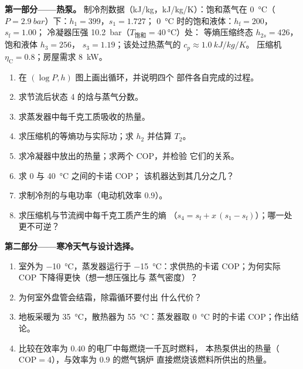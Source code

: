 \begin{problem}\label{pb:b2:open-systems:1}
\textbf{第一部分——热泵。}
制冷剂数据（\unit{kJ/kg}，\unit{kJ/kg/K}）：饱和蒸气在
\qty{0}{\celsius}（$P = \qty{2.9}{bar}$）下：$h_1 = 399$，$s_1 = 1.727$；
\qty{0}{\celsius} 时的饱和液体：$h_{\text{f}} = 200$，$s_{\text{f}} = 1.00$；
冷凝器压强 \qty{10.2}{bar}（$T_{\text{饱和}} = \qty{40}{\celsius}$）处：
等熵压缩终态 $h_{2s} = 426$，饱和液体 $h_3 = 256$，
$s_3 = 1.19$；该处过热蒸气的 $c_p \approx \qty{1.0}{kJ/kg/K}$。
压缩机 $\eta_{\text{C}} = 0.8$；房屋需求 \qty{8}{kW}。
\begin{enumerate}
  \item 在 $(\log P, h)$ 图上画出循环，并说明四个
        部件各自完成的过程。
  \item 求节流后状态 4 的焓与蒸气分数。
  \item 求蒸发器中每千克工质吸收的热量。
  \item 求压缩机的等熵功与实际功；求 $h_2$ 并估算
        $T_2$。
  \item 求冷凝器中放出的热量；求两个 COP，并检验
        它们的关系。
  \item 求 \qty{0}{} 与 \qty{40}{\celsius} 之间的卡诺 COP；
        该机器达到其几分之几？
  \item 求制冷剂的与电功率（电动机效率
        $0.9$）。
  \item 求压缩机与节流阀中每千克工质产生的熵
        （$s_4 = s_{\text{f}} + x\,(s_1 - s_{\text{f}})$）；哪一处
        更不可逆？
\end{enumerate}

\textbf{第二部分——寒冷天气与设计选择。}
\begin{enumerate}[resume]
  \item 室外为 \qty{-10}{\celsius}，蒸发器运行于
        \qty{-15}{\celsius}：求供热的卡诺 COP；为何实际
        COP 下降得更快（想一想压强比与
        蒸气密度）？
  \item 为何室外盘管会结霜，除霜循环要付出
        什么代价？
  \item 地板采暖为 \qty{35}{\celsius}，散热器为
        \qty{55}{\celsius}：蒸发器取
        \qty{0}{\celsius} 时的卡诺 COP；作出结论。
  \item 比较在效率为 $0.40$ 的电厂中每燃烧一千瓦时燃料，
        本热泵供出的热量（$\mathrm{COP}
        = 4$），与效率为 $0.9$ 的燃气锅炉
        直接燃烧该燃料所供出的热量。
\end{enumerate}


\end{problem}
